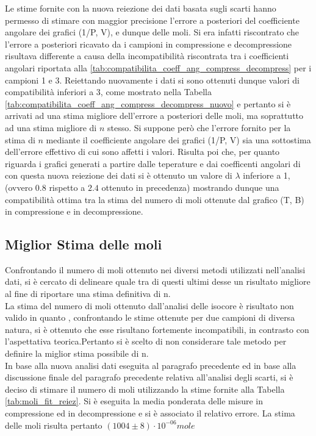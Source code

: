 \documentclass[a4paper,11pt,oneside]{article}
\begin{document}
Le stime fornite con la nuova reiezione dei dati basata sugli scarti hanno permesso di stimare con maggior precisione l'errore a posteriori del coefficiente angolare dei grafici (1/P, V), e dunque delle moli. Si era infatti riscontrato che l'errore a posteriori ricavato da i campioni in compressione e decompressione risultava differente a causa della incompatibilità riscontrata tra i coefficienti angolari riportata alla \ref{tab:compatibilita_coeff_ang_compress_decompress} per i campioni 1 e 3. Reiettando nuovamente i dati si sono ottenuti dunque valori di compatibilità inferiori a 3, come mostrato nella Tabella \ref{tab:compatibilita_coeff_ang_compress_decompress_nuovo} e pertanto si è arrivati ad una stima migliore dell'errore a posteriori delle moli, ma soprattutto ad una stima migliore di $n$ stesso. Si suppone però che l'errore fornito per la stima di $n$ mediante il coefficiente angolare dei grafici (1/P, V) sia una sottostima dell'errore effettivo di cui sono affetti i valori.
Risulta poi che, per quanto riguarda i grafici generati a partire dalle teperature e dai coefficenti angolari di  con questa nuova reiezione dei dati si è ottenuto un valore di $\lambda$ inferiore a 1, (ovvero $0.8$ rispetto a $2.4$ ottenuto in precedenza) mostrando dunque una compatibilità ottima tra la stima del numero di moli ottenute dal grafico (T, B) in compressione e in decompressione.\newline

\subsection{Miglior Stima delle moli}
Confrontando il numero di moli ottenuto nei diversi metodi utilizzati nell'analisi dati, si è cercato di delineare quale tra di questi ultimi desse un risultato migliore al fine di riportare una stima definitiva di n.\\
La stima del numero di moli ottenuto dall'analisi delle isocore è risultato non valido in quanto , confrontando le stime ottenute per due campioni di diversa natura, si è ottenuto che esse risultano fortemente incompatibili, in contrasto con l'aspettativa teorica.Pertanto si è scelto di non considerare tale metodo per definire la miglior stima possibile di n.\\
In base alla nuova analisi dati eseguita al paragrafo precedente ed in base alla discussione finale del paragrafo precedente relativa all'analisi degli scarti, si è deciso di stimare il numero di moli utilizzando la stime fornite alla Tabella \ref{tab:moli_fit_reiez}. Si è eseguita la media ponderata delle misure in compressione ed in decompressione e si è associato il relativo errore. La stima delle moli risulta pertanto $(1004\pm8)\cdot10^{-06} \si{mole}$
\end{document}
